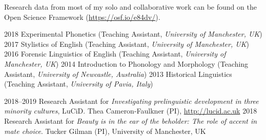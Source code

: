 \documentclass[9pt]{developercv} %
\begin{document}


\begin{entrylist}
	\entry
		{\hspace{1em}}
		{\textnormal{Research data from most of my solo and collaborative work can be found on the Open Science Framework (\url{https://osf.io/e84dv/}).}}
		{}
		{}
\end{entrylist}



\begin{entrylist}
	\entry
		{2018}
		{Experimental Phonetics \textnormal{(Teaching Assistant, \textit{University of Manchester, UK})}}
		{}
		{}
	\entry
		{2017}
		{Stylistics of English \textnormal{(Teaching Assistant, \textit{University of Manchester, UK})}}
		{}
		{}
	\entry
		{2016}
		{Forensic Linguistics of English \textnormal{(Teaching Assistant, \textit{University of Manchester, UK})}}
		{}
		{}
	\entry
		{2014}
		{Introduction to Phonology and Morphology \textnormal{(Teaching Assistant, \textit{University of Newcastle, Australia})}}
		{}
		{}
	\entry
		{2013}
		{Historical Linguistics \textnormal{(Teaching Assistant, \textit{University of Pavia, Italy})}}
		{}
		{}
\end{entrylist}



\begin{entrylist}
	\entry
		{2018--2019}
		{\textnormal{Research Assistant for \textit{Investigating prelinguistic development in three minority cultures}, LuCiD.}}
		{}
		{Thea Cameron-Faulkner (PI), \url{http://lucid.ac.uk}}
	\entry
		{2018}
		{\textnormal{Research Assistant for \textit{Beauty is in the ear of the beholder: The role of accent in mate choice}.}}
		{}
		{Tucker Gilman (PI), University of Manchester, UK}
\end{entrylist}
\end{document}
